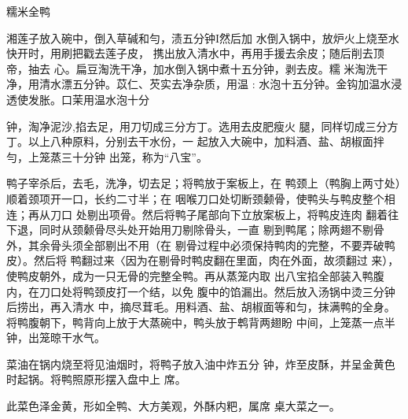 \begin{recipe}[八宝全鸭]{糯米全鸭}

\ingredients


\cooking

湘莲子放入碗中，倒入草碱和勻，渍五分钟I然后加 水倒入锅中，放炉火上烧至水快开时，用刷把戳去莲子皮， 携出放入清水中，再用手援去余皮；随后削去顶帝，抽去 心。扁豆淘洗干净，加水倒入锅中煮十五分钟，剥去皮。糯 米淘洗干净，用清水漂五分钟。苡仁、芡实去净杂质，用温 : 水泡十五分钟。金钩加温水浸透使发胀。口茉用温水泡十分

钟，淘净泥沙,掐去足，用刀切成三分方丁。选用去皮肥瘦火 腿，同样切成三分方丁。以上八种原料，分别去干水份，一 起放入大碗中，加料酒、盐、胡椒面拌勻，上笼蒸三十分钟 出笼，称为“八宝”。

\step 鸭子宰杀后，去毛，洗净，切去足；将鸭放于案板上，在 鸭颈上（鸭胸上两寸处）顺着颈项开一口，长约二寸半；在 咽喉刀口处切断颈颡骨，使鸭头与鸭皮整个相连；再从刀口 处剔出项骨。然后将鸭子尾部向下立放案板上，将鸭皮连肉 翻着往下退，同时从颈颡骨尽头处开始用刀剔除骨头，一直 剔到鸭尾；除两翅不剔骨外，其余骨头须全部剔出不用（在 剔骨过程中必须保持鸭肉的完整，不要弄破鸭皮）。然后将 鸭翻过来〈因为在剔骨时鸭皮翻在里面，肉在外面，故须翻过 来），使鸭皮朝外，成为一只无骨的完整全鸭。再从蒸笼内取 出八宝掐全部装入鸭腹内，在刀口处将鸭颈皮打一个结，以免 腹中的馅漏出。然后放入汤锅中烫三分钟后捞出，再入清水 中，摘尽茸毛。用料酒、盐、胡椒面等和匀，抹满鸭的全身。 将鸭腹朝下，鸭背向上放于大蒸碗中，鸭头放于鹎背两翅盼 中间，上笼蒸一点半钟，出笼晾干水气。

\step 菜油在锅内烧至将见油烟时，将鸭子放入油中炸五分 钟，炸至皮酥，并呈金黄色时起锅。将鸭照原形摆入盘中上 席。

\notes

此菜色泽金黄，形如全鸭、大方美观，外酥内粑，属席 桌大菜之一。

\end{recipe}

